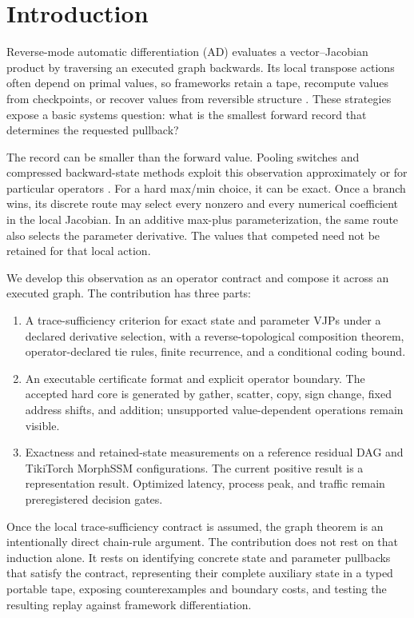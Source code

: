 \documentclass[10pt]{article}
\begin{document}
\section{Introduction}

Reverse-mode automatic differentiation (AD) evaluates a vector--Jacobian
product by traversing an executed graph backwards.  Its local transpose
actions often depend on primal values, so frameworks retain a tape, recompute
values from checkpoints, or recover values from reversible structure
\citep{giering1998recipes,griewank2000revolve,chen2016sublinear,gomez2017reversible}.
These strategies expose a basic systems question: what is the smallest forward
record that determines the requested pullback?

The record can be smaller than the forward value.  Pooling switches and
compressed backward-state methods exploit this observation approximately or
for particular operators \citep{zeiler2014visualizing,jain2018gist,novikov2023fewbit}.
For a hard max/min choice, it can be exact.  Once a branch wins, its discrete
route may select every nonzero and every numerical coefficient in the local
Jacobian.  In an additive max-plus parameterization, the same route also
selects the parameter derivative.  The values that competed need not be
retained for that local action.

We develop this observation as an operator contract and compose it across an
executed graph.  The contribution has three parts:

\begin{enumerate}[leftmargin=1.5em]
  \item A trace-sufficiency criterion for exact state and parameter VJPs under
  a declared derivative selection, with a reverse-topological composition
  theorem, operator-declared tie rules, finite recurrence, and a conditional
  coding bound.
  \item An executable certificate format and explicit operator boundary.  The
  accepted hard core is generated by gather, scatter, copy, sign change, fixed
  address shifts, and addition; unsupported value-dependent operations remain
  visible.
  \item Exactness and retained-state measurements on a reference residual DAG
  and TikiTorch MorphSSM configurations.  The current positive result is a
  representation result.  Optimized latency, process peak, and traffic remain
  preregistered decision gates.
\end{enumerate}

Once the local trace-sufficiency contract is assumed, the graph theorem is an
intentionally direct chain-rule argument.  The contribution does not rest on
that induction alone.  It rests on identifying concrete state and parameter
pullbacks that satisfy the contract, representing their complete auxiliary
state in a typed portable tape, exposing counterexamples and boundary costs,
and testing the resulting replay against framework differentiation.
\end{document}
